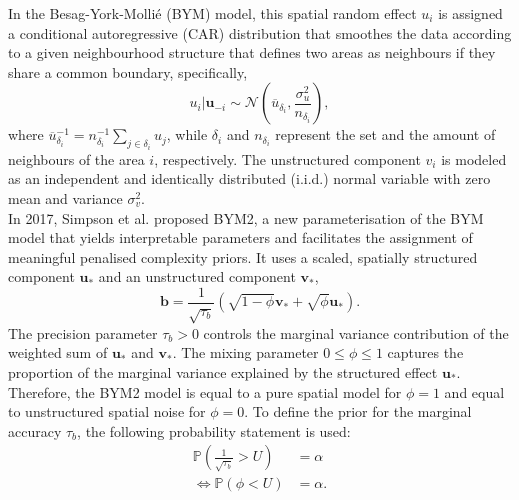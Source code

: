 \documentclass[12pt]{book}
\begin{document}
In the Besag-York-Mollié (BYM) model, this spatial random effect $u_i$ is assigned a conditional autoregressive (CAR) distribution that smoothes the data according to a given neighbourhood structure that defines two areas as neighbours if they share a common boundary, specifically,
\begin{equation}
    u_i|\pmb{u}_{-i}\sim\mathcal{N}\left(\overline{u}_{\delta_i}, \frac{\sigma_u^2}{n_{\delta_i}}\right),
\end{equation}
where $\overline{u}_{\delta_i}^{-1}=n_{\delta_i}^{-1}\sum_{j\in\delta_i} u_j$, while $\delta_i$ and $n_{\delta_i}$ represent the set and the amount of neighbours of the area $i$, respectively. The unstructured component $v_i$ is modeled as an independent and identically distributed (i.i.d.) normal variable with zero mean and variance $\sigma_v^2$. \\
In 2017, Simpson et al. proposed BYM2, a new parameterisation of the BYM model that yields interpretable parameters and facilitates the assignment of meaningful penalised complexity priors. It uses a scaled, spatially structured component $\pmb{u_*}$ and an unstructured component $\pmb{v_*}$,
\begin{equation}
    \pmb{b}=\frac{1}{\sqrt{\tau_b}}\left(\sqrt{1-\phi}\pmb{v_*}+\sqrt{\phi}\pmb{u_*}\right).
\end{equation}
The precision parameter $\tau_b > 0$ controls the marginal variance contribution of the weighted sum of $\pmb{u_*}$ and $\pmb{v_*}$. The mixing parameter $0\leq\phi\leq1$ captures the proportion of the marginal variance explained by the structured effect $\pmb{u}_*$. Therefore, the BYM2 model is equal to a pure spatial model for $\phi=1$ and equal to unstructured spatial noise for $\phi=0$. To define the prior for the marginal accuracy $\tau_b$, the following probability statement is used:
\begin{align}
    \mathbb{P}\left(\frac{1}{\sqrt{\tau_b}}>U\right)&=\alpha\nonumber\\
    \Longleftrightarrow\mathbb{P}\left(\phi <U\right)&=\alpha.
\end{align}
\end{document}
